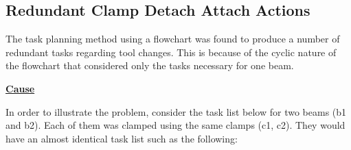 \subsection{Redundant Clamp Detach Attach Actions}
\label{subsection:exploration-3-redundant-clamp-detach-attach-actions}

The task planning method using a flowchart was found to produce a number of redundant tasks regarding tool changes. This is because of the cyclic nature of the flowchart that considered only the tasks necessary for one beam. 

\textbf{\ul{Cause}}

In order to illustrate the problem, consider the task list below for two beams (b1 and b2). Each of them was clamped using the same clamps (c1, c2). They would have an almost identical task list such as the following:

